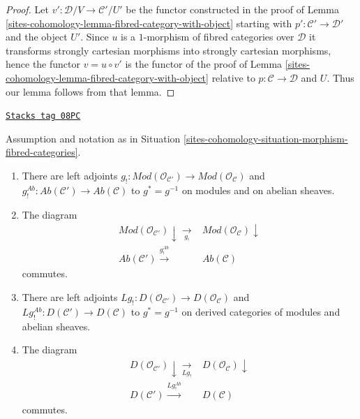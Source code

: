\begin{proof}
Let $v' : \mathcal{D}/V \to \mathcal{C}'/U'$ be the functor constructed
in the proof of Lemma \ref{sites-cohomology-lemma-fibred-category-with-object} starting
with $p' : \mathcal{C}' \to \mathcal{D}'$ and the object $U'$.
Since $u$ is a $1$-morphism of fibred categories over $\mathcal{D}$
it transforms strongly cartesian morphisms into strongly cartesian morphisms,
hence the functor $v = u \circ v'$ is the functor of
the proof of Lemma \ref{sites-cohomology-lemma-fibred-category-with-object}
relative to $p : \mathcal{C} \to \mathcal{D}$ and $U$. Thus our lemma
follows from that lemma.
\end{proof}

\begin{lemma}
\label{sites-cohomology-lemma-properties-lower-shriek-fibred-category}
\href{https://stacks.math.columbia.edu/tag/08PC}{\texttt{Stacks tag 08PC}}

Assumption and notation as in
Situation \ref{sites-cohomology-situation-morphism-fibred-categories}.
\begin{enumerate}
\item There are left adjoints
$g_! : \textit{Mod}(\mathcal{O}_{\mathcal{C}'}) \to
\textit{Mod}(\mathcal{O}_\mathcal{C})$ and
$g_!^{\textit{Ab}} : \textit{Ab}(\mathcal{C}') \to \textit{Ab}(\mathcal{C})$
to $g^* = g^{-1}$ on modules and on abelian sheaves.
\item The diagram
$$
\begin{array}{cc}\textit{Mod}(\mathcal{O}_{\mathcal{C}'}) \downarrow\underset{g_!}{\longrightarrow} & \textit{Mod}(\mathcal{O}_\mathcal{C}) \downarrow \\ \textit{Ab}(\mathcal{C}') \overset{g_!^{\textit{Ab}}}{\longrightarrow} & \textit{Ab}(\mathcal{C})\end{array}
$$
commutes.
\item There are left adjoints
$Lg_! : D(\mathcal{O}_{\mathcal{C}'}) \to D(\mathcal{O}_\mathcal{C})$
and
$Lg_!^{\textit{Ab}} : D(\mathcal{C}') \to D(\mathcal{C})$
to $g^* = g^{-1}$ on derived categories of modules and abelian sheaves.
\item The diagram
$$
\begin{array}{cc}D(\mathcal{O}_{\mathcal{C}'}) \downarrow\underset{Lg_!}{\longrightarrow} & D(\mathcal{O}_\mathcal{C}) \downarrow \\ D(\mathcal{C}') \overset{Lg_!^{\textit{Ab}}}{\longrightarrow} & D(\mathcal{C})\end{array}
$$
commutes.
\end{enumerate}
\end{lemma}

